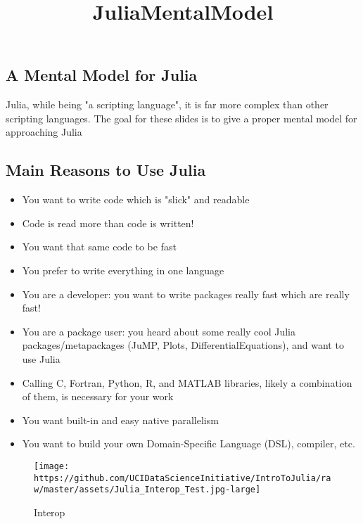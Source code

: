 \documentclass[11pt]{article}
\title{JuliaMentalModel}
\makeatletter
\def\maxwidth{\ifdim\Gin@nat@width>\linewidth\linewidth
    \else\Gin@nat@width\fi}
\let\Oldincludegraphics\includegraphics
\renewcommand{\includegraphics}[1]{\Oldincludegraphics[width=.8\maxwidth]{#1}}
\providecommand{\tightlist}{%
      \setlength{\itemsep}{0pt}\setlength{\parskip}{0pt}}
\makeatother
\begin{document}
    
    
    \maketitle
    
    

    
    \subsection{A Mental Model for Julia}\label{a-mental-model-for-julia}

Julia, while being "a scripting language", it is far more complex than
other scripting languages. The goal for these slides is to give a proper
mental model for approaching Julia

    \subsection{Main Reasons to Use Julia}\label{main-reasons-to-use-julia}

\begin{itemize}
\tightlist
\item
  You want to write code which is "slick" and readable
\item
  Code is read more than code is written!
\item
  You want that same code to be fast
\item
  You prefer to write everything in one language
\item
  You are a developer: you want to write packages really fast which are
  really fast!
\item
  You are a package user: you heard about some really cool Julia
  packages/metapackages (JuMP, Plots, DifferentialEquations), and want
  to use Julia
\item
  Calling C, Fortran, Python, R, and MATLAB libraries, likely a
  combination of them, is necessary for your work
\item
  You want built-in and easy native parallelism
\item
  You want to build your own Domain-Specific Language (DSL), compiler,
  etc.
\end{itemize}

    \begin{figure}
\centering
\texttt{[image: https://github.com/UCIDataScienceInitiative/IntroToJulia/raw/master/assets/Julia\_Interop\_Test.jpg-large]}
\caption{Interop}
\end{figure}
\end{document}
